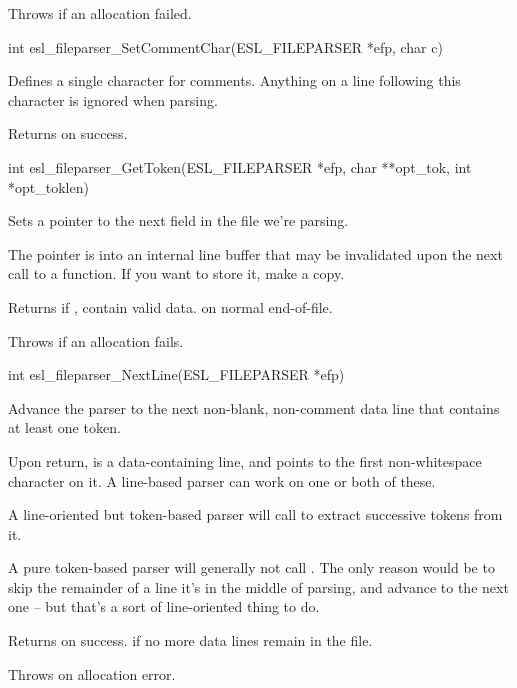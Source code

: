 \begin{sreapi}
Throws  if an allocation failed.



\hypertarget{func:esl_fileparser_SetCommentChar()}
{\item[int esl\_fileparser\_SetCommentChar(ESL\_FILEPARSER *efp, char c)]}

Defines a single character  for comments. Anything
on a line following this character is ignored
when parsing.

Returns  on success.


\hypertarget{func:esl_fileparser_GetToken()}
{\item[int esl\_fileparser\_GetToken(ESL\_FILEPARSER *efp, char **opt\_tok, int *opt\_toklen)]}

Sets a pointer to the next field in the 
file we're parsing.

The  pointer is into an internal line buffer
that may be invalidated upon the next call to a
 function. If you want to store it, make a
copy.

Returns  if ,  contain valid data.
 on normal end-of-file.

Throws  if an allocation fails.



\hypertarget{func:esl_fileparser_NextLine()}
{\item[int esl\_fileparser\_NextLine(ESL\_FILEPARSER *efp)]}

Advance the parser to the next non-blank, non-comment
data line that contains at least one token. 

Upon return,  is a data-containing line, and
 points to the first non-whitespace character on
it. A line-based parser can work on one or both of these.

A line-oriented but token-based parser will call
 to extract successive
tokens from it.

A pure token-based parser will generally not call
.  The only reason would be to skip the
remainder of a line it's in the middle of parsing, and
advance to the next one -- but that's a sort of
line-oriented thing to do.

Returns  on success.
 if no more data lines remain in the file.  

Throws  on allocation error.



\end{sreapi}

